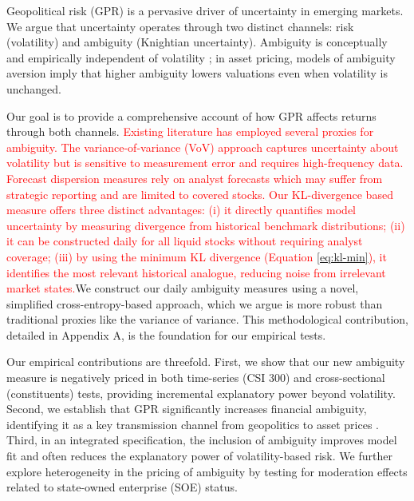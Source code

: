 \documentclass[preprint,12pt,authoryear]{elsarticle}
\begin{document}
Geopolitical risk (GPR) is a pervasive driver of uncertainty in emerging markets. We argue that uncertainty operates through two distinct channels: risk (volatility) and ambiguity (Knightian uncertainty). Ambiguity is conceptually and empirically independent of volatility \citep{Knight1921, Ellsberg1961}; in asset pricing, models of ambiguity aversion \citep{Gilboa1989, Klibanoff2005} imply that higher ambiguity lowers valuations even when volatility is unchanged.

Our goal is to provide a comprehensive account of how GPR affects returns through both channels. \textcolor{red}{Existing literature has employed several proxies for ambiguity. The variance-of-variance (VoV) approach \citep{Brenner2018} captures uncertainty about volatility but is sensitive to measurement error and requires high-frequency data. Forecast dispersion measures \citep{Anderson2018} rely on analyst forecasts which may suffer from strategic reporting and are limited to covered stocks. Our KL-divergence based measure offers three distinct advantages: (i) it directly quantifies model uncertainty by measuring divergence from historical benchmark distributions; (ii) it can be constructed daily for all liquid stocks without requiring analyst coverage; (iii) by using the minimum KL divergence (Equation \ref{eq:kl-min}), it identifies the most relevant historical analogue, reducing noise from irrelevant market states.}We construct our daily ambiguity measures using a novel, simplified cross-entropy-based approach, which we argue is more robust than traditional proxies like the variance of variance. This methodological contribution, detailed in Appendix A, is the foundation for our empirical tests.

Our empirical contributions are threefold. First, we show that our new ambiguity measure is negatively priced in both time-series (CSI 300) and cross-sectional (constituents) tests, providing incremental explanatory power beyond volatility. Second, we establish that GPR significantly increases financial ambiguity, identifying it as a key transmission channel from geopolitics to asset prices \citep{Caldara2022}. Third, in an integrated specification, the inclusion of ambiguity improves model fit and often reduces the explanatory power of volatility-based risk. We further explore heterogeneity in the pricing of ambiguity by testing for moderation effects related to state-owned enterprise (SOE) status.
\end{document}
